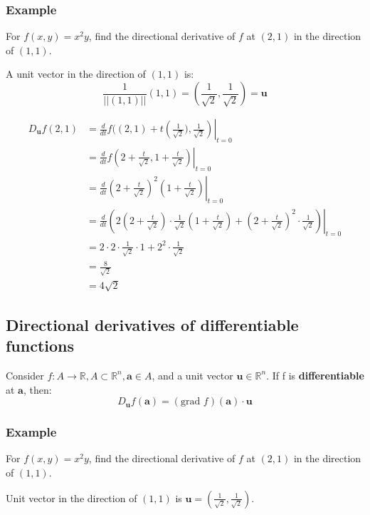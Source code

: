 \documentclass[11pt]{article}
\begin{document}
\subsubsection{Example}
\label{sec:orgd7cf43c}
For \(f(x, y) = x^2 y\), find the directional derivative of \(f\) at \((2, 1)\) in the direction of \((1, 1)\).


A unit vector in the direction of \((1, 1)\) is:
\[\frac{1}{||(1, 1)||} (1, 1) = \left(\frac{1}{\sqrt{2}}, \frac{1}{\sqrt{2}} \right) = \boldsymbol{u}\]

\begin{align*}
D_{\boldsymbol{u}} f(2, 1) &= \frac{d}{dt} f((2, 1) + t \left. \left(\frac{1}{\sqrt{2}}), \frac{1}{\sqrt{2}} \right) \right|_{t = 0} \\
&= \frac{d}{dt} f \left. \left(2 + \frac{t}{\sqrt{2}}, 1 + \frac{t}{\sqrt{2}} \right) \right|_{t = 0} \\
&= \frac{d}{dt} \left. \left(2 + \frac{t}{\sqrt{2}} \right)^2 \left(1 + \frac{t}{\sqrt{2}} \right) \right|_{t = 0} \\
&= \frac{d}{dt} \left. \left(2 \left(2 + \frac{t}{\sqrt{2}} \right) \cdot \frac{1}{\sqrt{2}} \left( 1 + \frac{t}{\sqrt{2}} \right) + \left( 2 + \frac{t}{\sqrt{2}} \right)^2 \cdot \frac{1}{\sqrt{2}} \right) \right|_{t = 0} \\
&= 2 \cdot 2 \cdot \frac{1}{\sqrt{2}} \cdot 1 + 2^2 \cdot \frac{1}{\sqrt{2}} \\
&= \frac{8}{\sqrt{2}} \\
&= 4 \sqrt{2}
\end{align*}
\subsection{Directional derivatives of differentiable functions}
\label{sec:org8c86e50}
Consider \(f : A \rightarrow \mathbb{R}, A \subset \mathbb{R}^n, \boldsymbol{a} \in A\), and a unit vector \(\boldsymbol{u} \in \mathbb{R}^n\). If f is \textbf{differentiable} at \(\boldsymbol{a}\), then:
\[D_{\boldsymbol{u}} f(\boldsymbol{a}) = (\text{grad } f) (\boldsymbol{a}) \cdot \boldsymbol{u}\]
\subsubsection{Example}
\label{sec:org54d5b43}
For \(f(x, y) = x^2 y\), find the directional derivative of \(f\) at \((2, 1)\) in the direction of \((1, 1)\).


Unit vector in the direction of \((1, 1)\) is \(\boldsymbol{u} = (\frac{1}{\sqrt{2}}, \frac{1}{\sqrt{2}})\).
\end{document}
